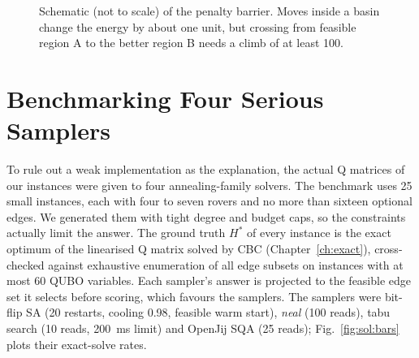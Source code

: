 \begin{figure}[htbp]
\centering
{}
\caption[Schematic (not to scale) of the penalty barrier.]{Schematic (not to scale) of the penalty barrier. Moves inside a
basin change the energy by about one unit, but crossing from feasible region
A to the better region B needs a climb of at least 100.}
\label{fig:sol:barrier}
\end{figure}

\section{Benchmarking Four Serious Samplers}

To rule out a weak implementation as the explanation, the actual Q matrices
of our instances were given to four annealing-family solvers. The benchmark
uses 25 small instances, each with four to seven rovers and no more than
sixteen optional edges. We generated them with tight degree and budget caps,
so the constraints actually limit the answer. The ground truth $H^{*}$ of every instance is the exact
optimum of the linearised Q matrix solved by CBC (Chapter~\ref{ch:exact}),
cross-checked against exhaustive enumeration of all edge subsets on instances
with at most 60 QUBO variables. Each sampler's answer is projected to the
feasible edge set it selects before scoring, which favours the samplers. The
samplers were bit-flip SA (20 restarts, cooling 0.98, feasible warm start),
\emph{neal} (100 reads), tabu search (10 reads, 200~ms limit) and OpenJij SQA
(25 reads); Fig.~\ref{fig:sol:bars} plots their exact-solve rates.



